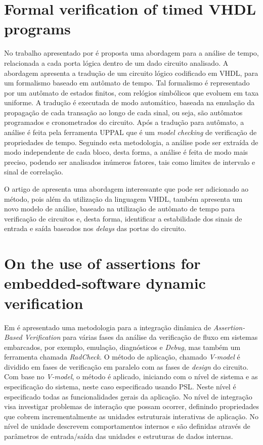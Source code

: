 \section{Formal verification of timed VHDL programs}
No trabalho apresentado por  é proposta uma abordagem para a análise de tempo, relacionada a cada porta lógica dentro de um dado circuito analisado. A abordagem apresenta a tradução de um circuito lógico codificado em VHDL, para um formalismo baseado em autômato de tempo\cite{alur1994theory}. Tal formalismo é representado por um autômato de estados finitos, com relógios simbólicos que evoluem em taxa uniforme. A tradução é executada de modo automático, baseada na emulação da propagação de cada transação ao longo de cada sinal, ou seja, são autômatos programados e cronometrados do circuito. Após a tradução para autômato, a análise é feita pela ferramenta UPPAL\cite{larsen1997uppaal} que é um \textit{model checking} de verificação de propriedades de tempo. Seguindo esta metodologia, a análise pode ser extraída de modo independente de cada bloco, desta forma, a análise é feita de modo mais preciso, podendo ser analisados inúmeros fatores, tais como limites de intervalo e sinal de correlação.

\par
O artigo de  apresenta uma abordagem interessante que pode ser adicionado ao método, pois além da utilização da linguagem VHDL, também apresenta um novo modelo de análise, baseado na utilização de autômato de tempo para verificação de circuitos e, desta forma, identificar a estabilidade dos sinais de entrada e saída baseados nos \textit{delays} das portas do circuito.

\section{On the use of assertions for embedded-software dynamic verification}
Em \citeauthor{di2012use} é apresentado uma metodologia para a integração dinâmica de \textit{Assertion-Based Verification} para várias fases da análise da verificação de fluxo em sistemas embarcados, por exemplo, emulação, diagnósticos e \textit{Debug}, mas também um ferramenta chamada \textit{RadCheck}. O método de aplicação, chamado \textit{V-model} é dividido em fases de verificação em paralelo com as fases de \textit{design} do circuito. Com base no \textit{V-model}, o método é aplicado, iniciando com o nível de sistema e as especificação do sistema, neste caso especificado usando PSL. Neste nível é especificado todas as funcionalidades gerais da aplicação. No nível de integração visa investigar problemas de interação que possam ocorrer, definindo propriedades que cobrem incrementalmente as unidades estruturais interativas de aplicação. No nível de unidade descrevem comportamentos internos e são definidas através de parâmetros de entrada/saída das unidades e estruturas de dados internas.

